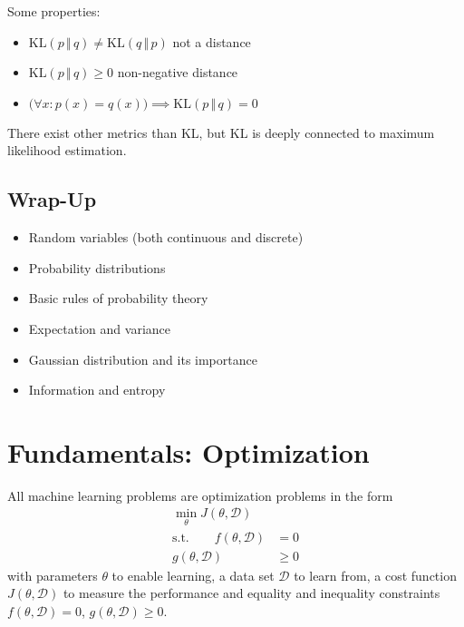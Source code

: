 			Some properties:
			\begin{itemize}
				\item \( \textrm{KL}(p \,\Vert\, q) \neq \textrm{KL}(q \,\Vert\, p) \) not a distance
				\item \( \textrm{KL}(p \,\Vert\, q) \geq 0 \) non-negative distance
				\item \( \big(\forall x : p(x) = q(x)\big) \implies \textrm{KL}(p \,\Vert\, q) = 0 \)
			\end{itemize}

			There exist other metrics than KL, but KL is deeply connected to maximum likelihood estimation. 
	
	\section{Wrap-Up}
		\begin{itemize}
			\item Random variables (both continuous and discrete)
			\item Probability distributions
			\item Basic rules of probability theory
			\item Expectation and variance
			\item Gaussian distribution and its importance
			\item Information and entropy
		\end{itemize}

\chapter{Fundamentals: Optimization}

	All machine learning problems are optimization problems in the form
	\begin{align}
		\min_\theta J(\theta, \mathcal{D}) & \\
		\textrm{s.t.} \qquad
		f(\theta, \mathcal{D}) &= 0 \\
		g(\theta, \mathcal{D}) &\geq 0
	\end{align}
	with parameters \(\theta\) to enable learning, a data set \(\mathcal{D}\) to learn from, a cost function \(J(\theta, \mathcal{D})\) to measure the performance and equality and inequality constraints \( f(\theta, \mathcal{D}) = 0 \), \( g(\theta, \mathcal{D}) \geq 0 \).

